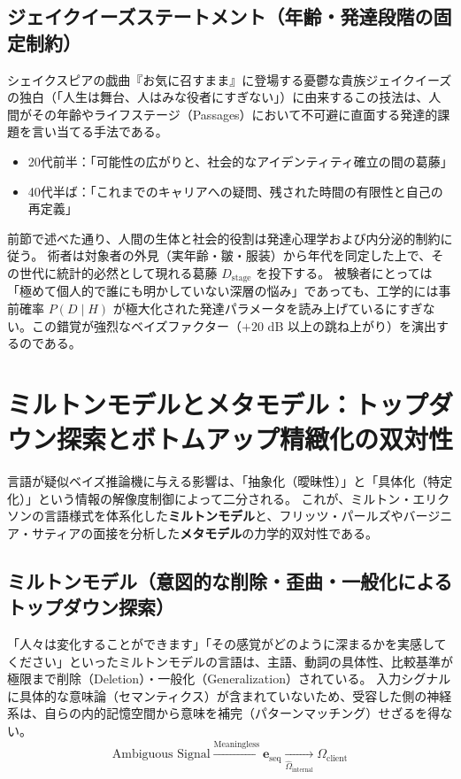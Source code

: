 \subsection{ジェイクイーズステートメント（年齢・発達段階の固定制約）}
シェイクスピアの戯曲『お気に召すまま』に登場する憂鬱な貴族ジェイクイーズの独白（「人生は舞台、人はみな役者にすぎない」）に由来するこの技法は、人間がその年齢やライフステージ（Passages）において不可避に直面する発達的課題を言い当てる手法である。
\begin{itemize}
    \item 20代前半：「可能性の広がりと、社会的なアイデンティティ確立の間の葛藤」
    \item 40代半ば：「これまでのキャリアへの疑問、残された時間の有限性と自己の再定義」
\end{itemize}
前節で述べた通り、人間の生体と社会的役割は発達心理学および内分泌的制約に従う。
術者は対象者の外見（実年齢・皺・服装）から年代を同定した上で、その世代に統計的必然として現れる葛藤 $D_{\mathrm{stage}}$ を投下する。
被験者にとっては「極めて個人的で誰にも明かしていない深層の悩み」であっても、工学的には事前確率 $P(D \mid H)$ が極大化された発達パラメータを読み上げているにすぎない。この錯覚が強烈なベイズファクター（$+20\text{ dB}$ 以上の跳ね上がり）を演出するのである。

\section{ミルトンモデルとメタモデル：トップダウン探索とボトムアップ精緻化の双対性}

言語が疑似ベイズ推論機に与える影響は、「抽象化（曖昧性）」と「具体化（特定化）」という情報の解像度制御によって二分される。
これが、ミルトン・エリクソンの言語様式を体系化した\textbf{ミルトンモデル}と、フリッツ・パールズやバージニア・サティアの面接を分析した\textbf{メタモデル}の力学的双対性である。

\subsection{ミルトンモデル（意図的な削除・歪曲・一般化によるトップダウン探索）}
「人々は変化することができます」「その感覚がどのように深まるかを実感してください」といったミルトンモデルの言語は、主語、動詞の具体性、比較基準が極限まで削除（Deletion）・一般化（Generalization）されている。
入力シグナルに具体的な意味論（セマンティクス）が含まれていないため、受容した側の神経系は、自らの内的記憶空間から意味を補完（パターンマッチング）せざるを得ない。
\begin{equation}
    \text{Ambiguous Signal} \xrightarrow{\text{Meaningless}} \boldsymbol{e}_{\mathrm{seq}} \xrightarrow[\hat{\Omega}_{\mathrm{internal}}]{} \Omega_{\mathrm{client}}
\end{equation}

